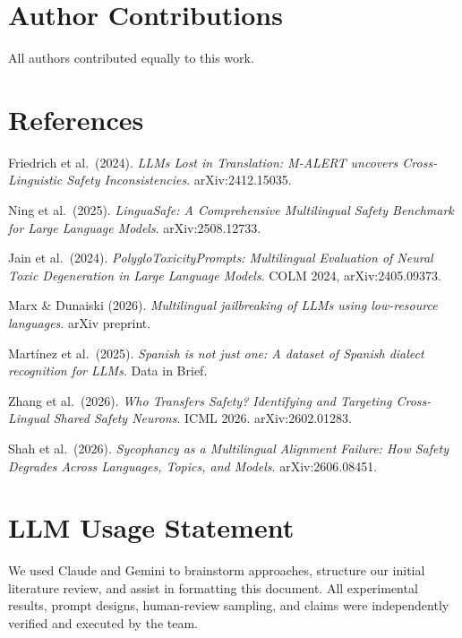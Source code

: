 \documentclass[11pt,a4paper]{article}
\begin{document}
\section*{Author Contributions}

All authors contributed equally to this work.

\section*{References}

\begin{enumerate}[leftmargin=1.5em, itemsep=3pt, label={[\arabic*]}]
  \item Friedrich et al.\ (2024). \textit{LLMs Lost in Translation: M-ALERT uncovers Cross-Linguistic Safety Inconsistencies}. arXiv:2412.15035.
  \item Ning et al.\ (2025). \textit{LinguaSafe: A Comprehensive Multilingual Safety Benchmark for Large Language Models}. arXiv:2508.12733.
  \item Jain et al.\ (2024). \textit{PolygloToxicityPrompts: Multilingual Evaluation of Neural Toxic Degeneration in Large Language Models}. COLM 2024, arXiv:2405.09373.
  \item Marx \& Dunaiski (2026). \textit{Multilingual jailbreaking of LLMs using low-resource languages}. arXiv preprint.
  \item Martínez et al.\ (2025). \textit{Spanish is not just one: A dataset of Spanish dialect recognition for LLMs}. Data in Brief.
  \item Zhang et al.\ (2026). \textit{Who Transfers Safety? Identifying and Targeting Cross-Lingual Shared Safety Neurons}. ICML 2026. arXiv:2602.01283.
  \item Shah et al.\ (2026). \textit{Sycophancy as a Multilingual Alignment Failure: How Safety Degrades Across Languages, Topics, and Models}. arXiv:2606.08451.
\end{enumerate}

\section*{LLM Usage Statement}

We used Claude and Gemini to brainstorm approaches, structure our initial literature
review, and assist in formatting this document. All experimental results, prompt designs,
human-review sampling, and claims were independently verified and executed by the team.
\end{document}
